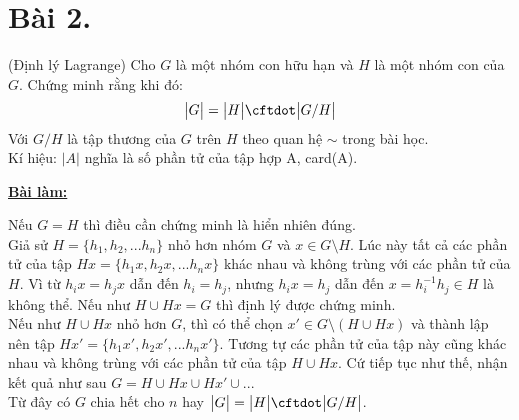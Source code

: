 \section*{Bài 2.}

(Định lý Lagrange) Cho $G$ là một nhóm con hữu hạn và $H$ là một nhóm con của $G$. Chứng minh rằng khi đó:
$$\big| G \big| = \big| H \big| \cftdot \big| G/H \big|$$
Với $G/H$ là tập thương của $G$ trên $H$ theo quan hệ $\sim$ trong bài học.\\
Kí hiệu: $\big| A \big|$ nghĩa là số phần tử của tập hợp A, card(A).
	

\centering
\textbf{\underline{Bài làm:}}

\justifying
Nếu $G = H$ thì điều cần chứng minh là hiển nhiên đúng.\\
Giả sử $H = \{h_1, h_2,... h_n\}$ nhỏ hơn nhóm $G$ và $x \in G \setminus H$. Lúc này tất cả các phần tử của tập $Hx = \{h_1x, h_2x,... h_nx\}$ khác nhau và không trùng với các phần tử của $H$. Vì từ $h_ix = h_jx$ dẫn đến $h_i = h_j$, nhưng $h_ix = h_j$ dẫn đến $x = h_i^{-1}h_j \in H$ là không thể. Nếu như $H \cup Hx = G$ thì định lý được chứng minh.\\
Nếu như $H \cup Hx$ nhỏ hơn $G$, thì có thể chọn $x' \in G \setminus (H \cup Hx)$ và thành lập nên tập $Hx' = \{h_1x', h_2x',... h_nx'\}$. Tương tự các phần tử của tập này cũng khác nhau và không trùng với các phần tử của tập $H \cup Hx$. Cứ tiếp tục như thế, nhận kết quả như sau $G = H \cup Hx \cup Hx' \cup ...$\\
Từ đây có $G$ chia hết cho $n$ hay $\big| G \big| = \big| H \big| \cftdot \big| G/H \big|$.

	
\clearpage